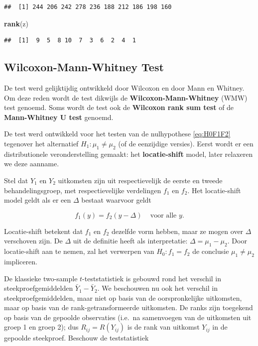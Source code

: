 \documentclass[
  12pt,dutch]{book}
\newenvironment{Shaded}{\begin{snugshade}}{\end{snugshade}}
\newcommand{\FunctionTok}[1]{\textcolor[rgb]{0.13,0.29,0.53}{\textbf{#1}}}
\newcommand{\NormalTok}[1]{#1}
\theoremstyle{definition}
\theoremstyle{definition}
\theoremstyle{definition}
\theoremstyle{definition}
\theoremstyle{remark}
\begin{document}
\begin{verbatim}
##  [1] 244 206 242 278 236 188 212 186 198 160
\end{verbatim}

\begin{Shaded}
\begin{Highlighting}[]
\FunctionTok{rank}\NormalTok{(z)}
\end{Highlighting}
\end{Shaded}

\begin{verbatim}
##  [1]  9  5  8 10  7  3  6  2  4  1
\end{verbatim}

\subsection{Wilcoxon-Mann-Whitney Test}\label{wilcoxon-mann-whitney-test}

De test werd gelijktijdig ontwikkeld door Wilcoxon en door Mann en Whitney. Om deze reden wordt de test dikwijls de \textbf{Wilcoxon-Mann-Whitney} (WMW) test genoemd. Soms wordt de test ook de \textbf{Wilcoxon rank sum test} of de \textbf{Mann-Whitney U test} genoemd.

De test werd ontwikkeld voor het testen van de nulhypothese \eqref{eq:H0F1F2} tegenover het alternatief \(H_1: \mu_1\neq \mu_2\) (of de eenzijdige versies). Eerst wordt er een distributionele veronderstelling gemaakt: het \textbf{locatie-shift} model, later relaxeren we deze aanname.

Stel dat \(Y_1\) en \(Y_2\) uitkomsten zijn uit respectievelijk de eerste en tweede behandelingsgroep, met respectievelijke verdelingen \(f_1\) en \(f_2\). Het locatie-shift model geldt als er een \(\Delta\) bestaat waarvoor geldt

\[
   f_1(y)=f_2(y-\Delta) \;\;\;\text{ voor alle } y.
 \]

Locatie-shift betekent dat \(f_1\) en \(f_2\) dezelfde vorm hebben, maar ze mogen over \(\Delta\) verschoven zijn.
De \(\Delta\) uit de definitie heeft als interpretatie: \(\Delta = \mu_1-\mu_2\).
Door locatie-shift aan te nemen, zal het verwerpen van \(H_0: f_1=f_2\) de conclusie \(\mu_1\neq \mu_2\) impliceren.

De klassieke two-sample \(t\)-teststatistiek is gebouwd rond het verschil in steekproefgemiddelden \(\bar{Y}_1-\bar{Y}_2\). We beschouwen nu ook het verschil in steekproefgemiddelden, maar niet op basis van de oorspronkelijke uitkomsten, maar op basis van de rank-getransformeerde uitkomsten. De ranks zijn toegekend op basis van de gepoolde observaties (i.e.~na samenvoegen van de uitkomsten uit groep 1 en groep 2); dus \(R_{ij}=R(Y_{ij})\) is de rank van uitkomst \(Y_{ij}\) in de gepoolde steekproef.
Beschouw de teststatistiek
\end{document}
